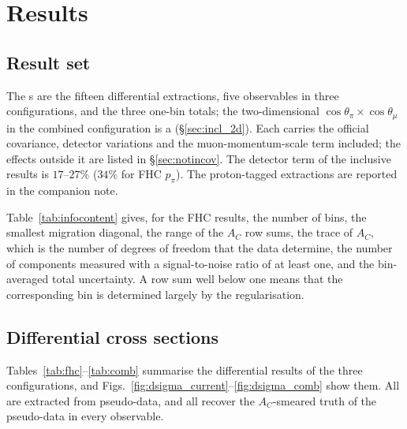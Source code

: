 \documentclass[11pt,a4paper]{article}
\begin{document}
\section{Results}
\label{sec:results}
\label{sec:rhc}

\subsection{Result set}
\label{sec:status_matrix}

The \statPrimary{}s are the fifteen differential extractions, five
observables in three configurations, and the three one-bin totals; the two-dimensional
$\cos\theta_\pi\times\cos\theta_\mu$ in the combined configuration is a \statSecondary{}
(\S\ref{sec:incl_2d}). Each carries the official covariance, detector variations and the
muon-momentum-scale term included; the effects outside it are listed in \S\ref{sec:notincov}. The
detector term of the inclusive results is $17$--$27\%$ ($34\%$ for FHC $p_\pi$). The proton-tagged
extractions are reported in the companion note.

%


Table~\ref{tab:infocontent} gives, for the FHC results, the number of bins, the smallest migration
diagonal, the range of the $A_C$ row sums, the trace of $A_C$, which is the number of degrees of
freedom that the data determine, the number of components measured with a signal-to-noise ratio of
at least one, and the bin-averaged total uncertainty. A row sum well below one means that the
corresponding bin is determined largely by the regularisation.



\subsection{Differential cross sections}

Tables~\ref{tab:fhc}--\ref{tab:comb} summarise the differential results of the three
configurations, and Figs.~\ref{fig:dsigma_current}--\ref{fig:dsigma_comb} show them. All are
extracted from pseudo-data, and all recover the $A_C$-smeared truth of the pseudo-data in every
observable.
\end{document}
